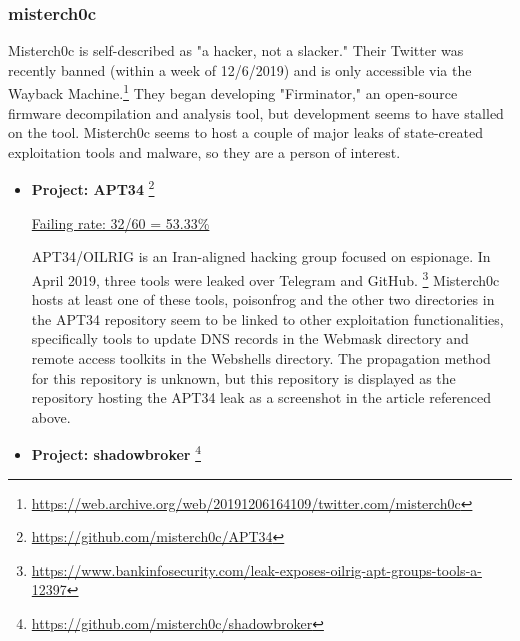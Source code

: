 \documentclass[]{acmart}
\begin{document}
\subsubsection{misterch0c}
Misterch0c is self-described as "a hacker, not a slacker." Their Twitter was recently banned (within a week of 12/6/2019) and is only accessible via the Wayback Machine.\footnote{\url{https://web.archive.org/web/20191206164109/twitter.com/misterch0c}} They began developing "Firminator," an open-source firmware decompilation and analysis tool, but development seems to have stalled on the tool. Misterch0c seems to host a couple of major leaks of state-created exploitation tools and malware, so they are a person of interest.
\begin{itemize}
    \item { \bf Project: APT34 }\footnote{\url{ https://github.com/misterch0c/APT34}}
    
    \underline{ Failing rate: 32/60 = 53.33\% }
    
    APT34/OILRIG is an Iran-aligned hacking group focused on espionage. In April 2019, three tools were leaked over Telegram and GitHub.  \footnote{\url{https://www.bankinfosecurity.com/leak-exposes-oilrig-apt-groups-tools-a-12397}} Misterch0c hosts at least one of these tools, poisonfrog and the other two directories in the APT34 repository seem to be linked to other exploitation functionalities, specifically tools to update DNS records in the Webmask directory and remote access toolkits in the Webshells directory. The propagation method for this repository is unknown, but this repository is displayed as the repository hosting the APT34 leak as a screenshot in the article referenced above.
    \item { \bf Project: shadowbroker }\footnote{\url{https://github.com/misterch0c/shadowbroker}}
    

\end{itemize}
\end{document}
